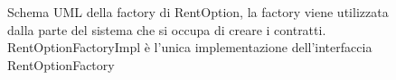 \begin{figure}[H]
    \centering
    \caption{Schema UML della factory di RentOption, la factory viene utilizzata dalla parte del sistema che si occupa di creare i contratti. 
    RentOptionFactoryImpl è l'unica implementazione dell'interfaccia RentOptionFactory}
	\label{img:RentOptionFactory}
\end{figure}
